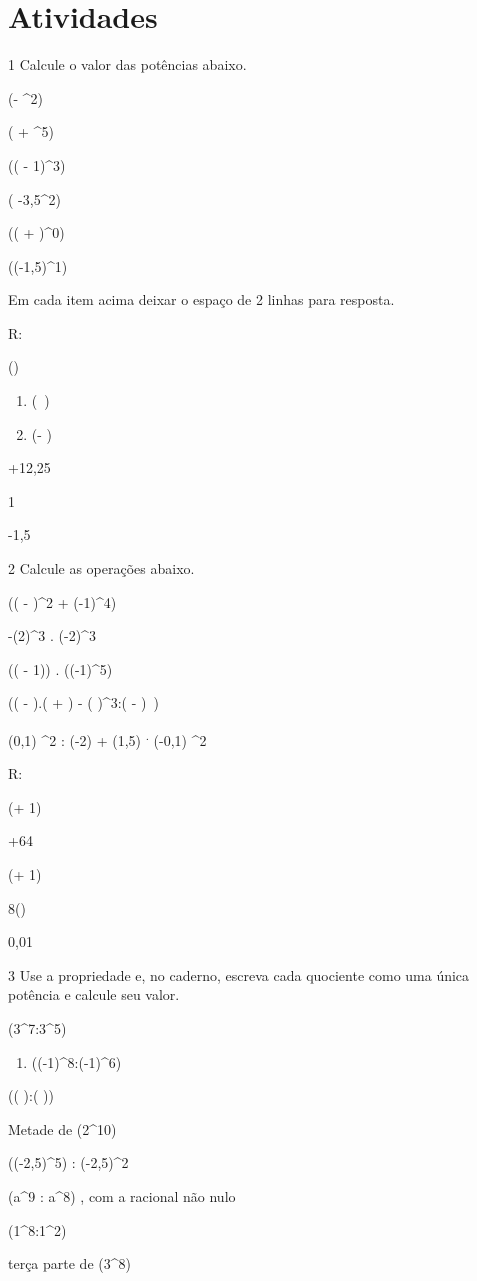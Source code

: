 \section{Atividades}

\num{1} Calcule o valor das potências abaixo.
\item (- ^2)
\item ( + ^5)
\item (( - 1)^3)
\item ( -3,5^2)
\item (( + )^0)
\item ((-1,5)^1)

Em cada item acima deixar o espaço de 2 linhas para resposta.

R:
\item ()

\begin{enumerate}
\def\labelenumi{\alph{enumi})}
\setcounter{enumi}{1}
\item
  (\ )
\item
  (- )
\end{enumerate}
\item +12,25
\item 1
\item -1,5

\num{2} Calcule as operações abaixo.
\item (( - )^2 \; + \; (-1)^4)
\item -(2)^3 . (-2)^3
\item (( - 1)) . ((-1)^5)
\item(\left( -  \right).\left( +  \right) - \left(  \right)^{3}:( - )\ )
\item (0,1) ^2 : (-2) + (1,5) \textsuperscript{.} (-0,1) ^2

R:
\item (+ 1)
\item +64
\item (+ 1)
\item 8()
\item 0,01

\num{3} Use a propriedade e, no caderno, escreva cada quociente como uma
única potência e calcule seu valor.
\item (3^7:3^5)

\begin{enumerate}
\def\labelenumi{\alph{enumi})}
\setcounter{enumi}{1}
\tightlist
\item
  ((-1)^8:(-1)^6)
\end{enumerate}
\item(\left(  \right):\left(  \right))
\item Metade de (2^10)
\item ((-2,5)^5) : (-2,5)^2
\item (a^9 : a^8) , com a racional não nulo
\item (1^8:1^2)
\item terça parte de (3^8)

